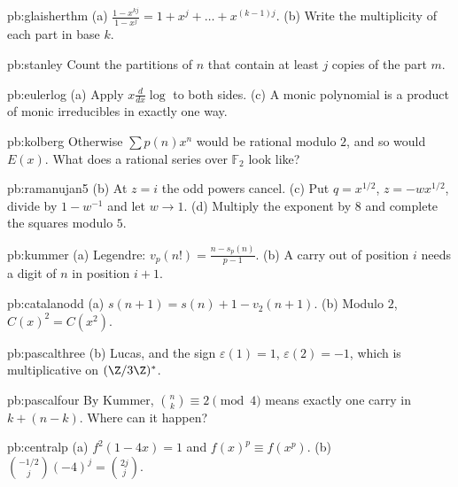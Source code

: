 \begin{hint}{pb:glaisherthm}
(a) $\frac{1-x^{kj}}{1-x^j}=1+x^j+\dots+x^{(k-1)j}$. (b) Write the multiplicity of each part in base $k$.
\end{hint}

\begin{hint}{pb:stanley}
Count the partitions of $n$ that contain at least $j$ copies of the part $m$.
\end{hint}

\begin{hint}{pb:eulerlog}
(a) Apply $x\frac d{dx}\log$ to both sides. (c) A monic polynomial is a product of monic irreducibles in exactly one way.
\end{hint}

\begin{hint}{pb:kolberg}
Otherwise $\sum p(n)x^n$ would be rational modulo $2$, and so would $E(x)$. What does a rational series over $\mathbb F_2$ look
like?
\end{hint}

\begin{hint}{pb:ramanujan5}
(b) At $z=i$ the odd powers cancel. (c) Put $q=x^{1/2}$, $z=-wx^{1/2}$, divide by $1-w^{-1}$ and let $w\to1$. (d) Multiply the
exponent by $8$ and complete the squares modulo $5$.
\end{hint}

\begin{hint}{pb:kummer}
(a) Legendre: $v_p(n!)=\frac{n-s_p(n)}{p-1}$. (b) A carry out of position $i$ needs a digit of $n$ in position $i+1$.
\end{hint}

\begin{hint}{pb:catalanodd}
(a) $s(n+1)=s(n)+1-v_2(n+1)$. (b) Modulo $2$, $C(x)^2=C(x^2)$.
\end{hint}

\begin{hint}{pb:pascalthree}
(b) Lucas, and the sign $\varepsilon(1)=1$, $\varepsilon(2)=-1$, which is multiplicative on $(\Z/3\Z)^*$.
\end{hint}

\begin{hint}{pb:pascalfour}
By Kummer, $\binom nk\equiv2\pmod4$ means exactly one carry in $k+(n-k)$. Where can it happen?
\end{hint}

\begin{hint}{pb:centralp}
(a) $f^2(1-4x)=1$ and $f(x)^p\equiv f(x^p)$. (b) $\binom{-1/2}j(-4)^j=\binom{2j}j$.
\end{hint}

